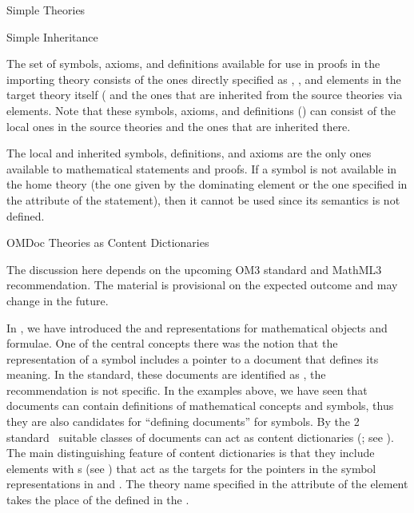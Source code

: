 \begin{module}[id=theories]
\begin{omgroup}{Simple Theories}
\begin{omgroup}[id=inheritance]{Simple Inheritance}
\begin{omtext}
  The set of symbols, axioms, and definitions available for use in proofs in the importing
  theory consists of the ones directly specified as , ,
  and  elements in the target theory itself ( and the ones that are inherited from
  the source theories via  elements.  Note that these symbols, axioms,
  and definitions () can consist of the local
  ones in the source theories and the ones that are inherited there.
\end{omtext}

The local and inherited symbols, definitions, and axioms are the only ones
available to mathematical statements and proofs. If a symbol is not available in
the home theory (the one given by the dominating  element or the
one specified in the  attribute of the statement),
then it cannot be used since its semantics is not defined.
\end{omgroup}

\begin{omgroup}[id=identifying]{OMDoc Theories as Content Dictionaries}
\begin{oldpart}{The discussion here depends on the upcoming OM3 standard and MathML3
    recommendation. The material is provisional on the expected outcome and may change in
    the future.}


\begin{omtext}
  In , we have introduced the {\openmath} and {\cmathml} representations for
  mathematical objects and formulae. One of the central concepts there was the notion that
  the representation of a symbol includes a pointer to a document that defines its
  meaning.  In the {\openmath} standard, these documents are identified as
  , the
  {\mathml} recommendation is not specific.  In the examples above, we have seen that
  \omdoc documents can contain definitions of mathematical concepts and symbols, thus
  they are also candidates for ``defining documents'' for symbols.  By the {\openmath}2
  standard~\cite{BusCapCar:2oms04} suitable classes of \omdoc documents can act as
  {\openmath} content dictionaries (; see ).  The main
  distinguishing feature of \omdoc content dictionaries is that they include
   elements with {s} (see
  ) that act as the targets for the pointers in the symbol
  representations in {\openmath} and {\cmathml}. The theory name specified in the
   attribute of the  element takes
  the place of the {} defined in the .
\end{omtext}


\end{oldpart}
\end{omgroup}
\end{omgroup}
\end{module}
